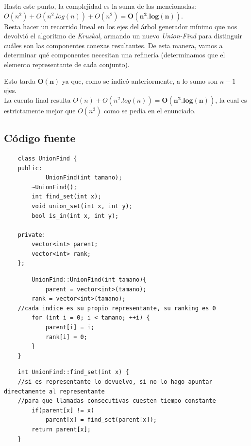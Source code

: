 	Hasta este punto, la complejidad es la suma de las mencionadas:  $ O(n^2) + O(n^2.log(n)) + O(n^2) = \mathbf{O(n^2.log(n))}$.\\

	Resta hacer un recorrido lineal en los ejes del \'arbol generador m\'inimo que nos devolvi\'o el algoritmo de \textit{Kruskal}, armando un nuevo \textit{Union-Find} para distinguir cu\'ales son las componentes conexas resultantes. De esta manera, vamos a determinar 	qu\'e componentes necesitan una refiner\'ia (determinamos que el elemento representante de cada conjunto).
		
	 Esto tarda $\mathbf{O(n)}$ ya que, como se indic\'o anteriormente, a lo sumo son $n-1$ ejes.\\

	La cuenta final resulta $O(n) + O(n^2.log(n)) = \mathbf{O(n^2.log(n))}$, la cual es estrictamente mejor que $O(n^3)$ como se ped\'ia en el enunciado.


\newpage
\subsection{C\'odigo fuente}

	\begin{codesnippet}
	\begin{verbatim}
    class UnionFind {
    public:
        	UnionFind(int tamano);
        ~UnionFind();
        int find_set(int x);
        void union_set(int x, int y);
        bool is_in(int x, int y);

    private:
        vector<int> parent;
        vector<int> rank;
    };
	\end{verbatim}
	\end{codesnippet}

	\begin{codesnippet}
	\begin{verbatim}
    	UnionFind::UnionFind(int tamano){
        	parent = vector<int>(tamano);
        rank = vector<int>(tamano);
    //cada indice es su propio representante, su ranking es 0
        for (int i = 0; i < tamano; ++i) {
            parent[i] = i;
            rank[i] = 0;
        }
    }
	\end{verbatim}
	\end{codesnippet}

	\begin{codesnippet}
	\begin{verbatim}
    int UnionFind::find_set(int x) {
    //si es representante lo devuelvo, si no lo hago apuntar directamente al representante
    //para que llamadas consecutivas cuesten tiempo constante
        if(parent[x] != x)
            parent[x] = find_set(parent[x]);
        return parent[x];
    }
	\end{verbatim}
	\end{codesnippet}

